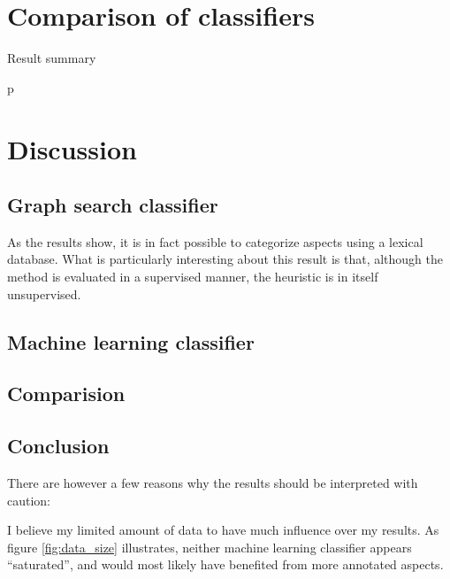 \documentclass[a4paper,11pt]{kth-mag}
\begin{document}

\section{Comparison of classifiers}
\label{sec:comparison}

\begin{table}[h]
  \centering

  \vspace{0.4cm}\caption{Result summary}
  \label{general_asp}
p\end{table}


\section{Discussion}
\subsection{Graph search classifier}
As the results show, it is in fact possible to categorize aspects using a lexical database.
What is particularly interesting about this result is that, although the method is evaluated in a supervised
manner, the heuristic is in itself unsupervised. %



\subsection{Machine learning classifier}

\subsection{Comparision}

\subsection{Conclusion}

There are however a few reasons why the results should be interpreted with caution:

I believe my limited amount of data to have much influence over my results.
As figure \ref{fig:data_size} illustrates, neither machine learning classifier
appears ``saturated'', and would most likely have benefited from more annotated aspects.
\end{document}

